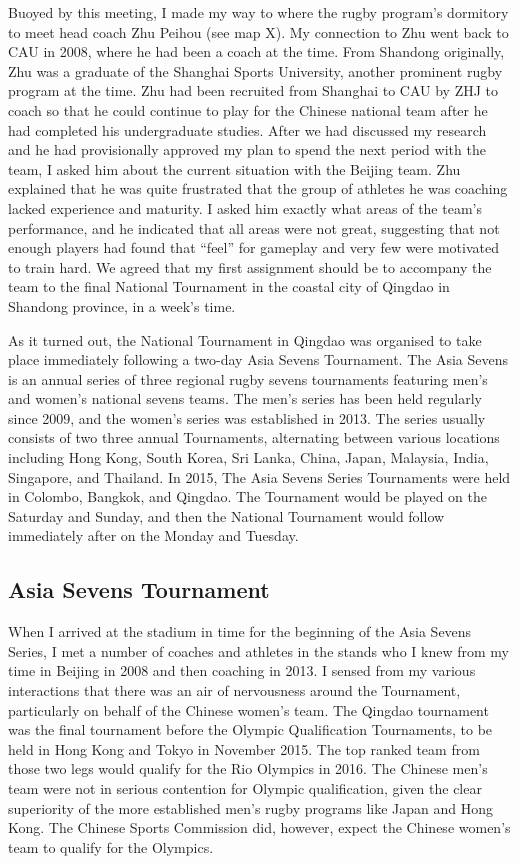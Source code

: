 \begin{CJK}{UTF8}{gbsn}
Buoyed by this meeting, I made my way to where the rugby program's dormitory to meet head coach Zhu Peihou (see map X).  My connection to Zhu went back to CAU in 2008, where he had been a coach at the time. From Shandong originally, Zhu was a graduate of the Shanghai Sports University, another prominent rugby program at the time.  Zhu had been recruited from Shanghai to CAU by ZHJ to coach so that he could continue to play for the Chinese national team after he had completed his undergraduate studies.  After we had discussed my research and he had provisionally approved my plan to spend the next period with the team, I asked him about the current situation with the Beijing team.  Zhu explained that he was quite frustrated that the group of athletes he was coaching lacked experience and maturity. I asked him exactly what areas of the team's performance, and he indicated that all areas were not great, suggesting that not enough players had found that ``feel'' for gameplay and very few were motivated to train hard.  We agreed that my first assignment should be to accompany the team to the final National Tournament in the coastal city of Qingdao in Shandong province, in a week's time.

As it turned out, the National Tournament in Qingdao was organised to take place immediately following a two-day Asia Sevens Tournament.  The Asia Sevens is an annual series of three regional rugby sevens tournaments featuring men's and women's national sevens teams.  The men's series has been held regularly since 2009, and the women's series was established in 2013. The series usually consists of two three annual Tournaments, alternating between various locations including Hong Kong, South Korea, Sri Lanka, China, Japan, Malaysia, India, Singapore, and Thailand.  In 2015, The Asia Sevens Series Tournaments were held in Colombo, Bangkok, and Qingdao. The Tournament would be played on the Saturday and Sunday, and then the National Tournament would follow immediately after on the Monday and Tuesday.

\subsection{Asia Sevens Tournament}
When I arrived at the stadium in time for the beginning of the Asia Sevens Series, I met a number of coaches and athletes in the stands who I knew from my time in Beijing in 2008 and then coaching in 2013. I sensed from my various interactions that there was an air of nervousness around the Tournament, particularly on behalf of the Chinese women's team.   The Qingdao tournament was the final tournament before the Olympic Qualification Tournaments, to be held in Hong Kong and Tokyo in November 2015.  The top ranked team from those two legs would qualify for the Rio Olympics in 2016.  The Chinese men's team were not in serious contention for Olympic qualification, given the clear superiority of the more established men's rugby programs like Japan and Hong Kong. The Chinese Sports Commission did, however, expect the Chinese women's team to qualify for the Olympics.


\end{CJK}
